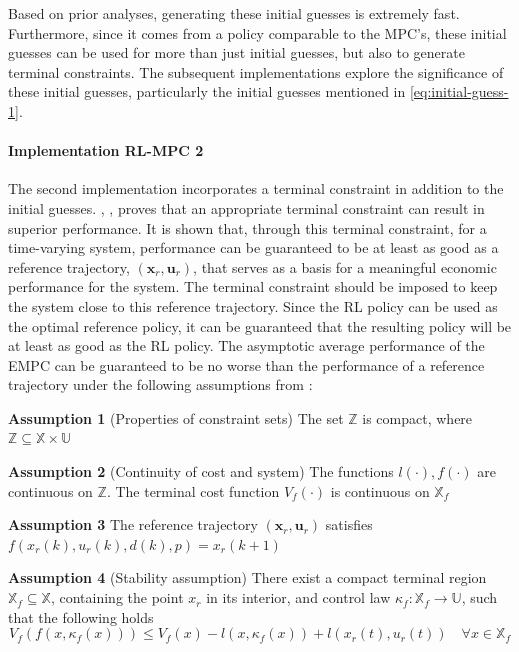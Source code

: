 Based on prior analyses, generating these initial guesses is extremely fast. Furthermore, since it comes from a policy comparable to the MPC’s, these initial guesses can be used for more than just initial guesses, but also to generate terminal constraints. The subsequent implementations explore the significance of these initial guesses, particularly the initial guesses mentioned in \autoref{eq:initial-guess-1}.

\paragraph{Implementation RL-MPC 2}
The second implementation incorporates a terminal constraint in addition to the initial guesses. \citet{risbeckEconomicModelPredictive2020}, \citet{amritEconomicOptimizationUsing2011}, proves that an appropriate terminal constraint can result in superior performance. It is shown that, through this terminal constraint, for a time-varying system, performance can be guaranteed to be at least as good as a reference trajectory, $(\mathbf{x}_r, \mathbf{u}_r)$, that serves as a basis for a meaningful economic performance for the system. The terminal constraint should be imposed to keep the system close to this reference trajectory. Since the RL policy can be used as the optimal reference policy, it can be guaranteed that the resulting policy will be at least as good as the RL policy. The asymptotic average performance of the EMPC can be guaranteed to be no worse than the performance of a reference trajectory under the following assumptions from \citet{amritEconomicOptimizationUsing2011,risbeckEconomicModelPredictive2020}:

\hspace{1cm} \textbf{Assumption 1} (Properties of constraint sets) The set $\mathbb{Z}$ is compact, where $\mathbb{Z} \subseteq \mathbb{X} \times \mathbb{U}$

\hspace{1cm} \textbf{Assumption 2}  (Continuity of cost and system) The functions $l(\cdot), f(\cdot)$ are continuous on $\mathbb{Z}$. The terminal cost function $V_f(\cdot)$ is continuous on $\mathbb{X}_f$ 

\hspace{1cm} \textbf{Assumption 3}  The reference trajectory $(\mathbf{x}_r, \mathbf{u}_r)$ satisfies $f(x_r(k),u_r(k),d(k),p)=x_r(k+1)$

\hspace{1cm} \textbf{Assumption 4} (Stability assumption) There exist a compact terminal region $\mathbb{X}_f \subseteq \mathbb{X}$, containing the point $x_r$ in its interior, and control law $\kappa_f : \mathbb{X}_f \rightarrow \mathbb{U}$, such that the following holds 
\begin{equation}\label{eq:assumption_3}
	V_f(f(x,\kappa_f(x))) \leq V_f(x) - l(x,\kappa_f(x)) + l(x_r(t),u_r(t)) \quad \forall x \in \mathbb{X}_f
\end{equation}


